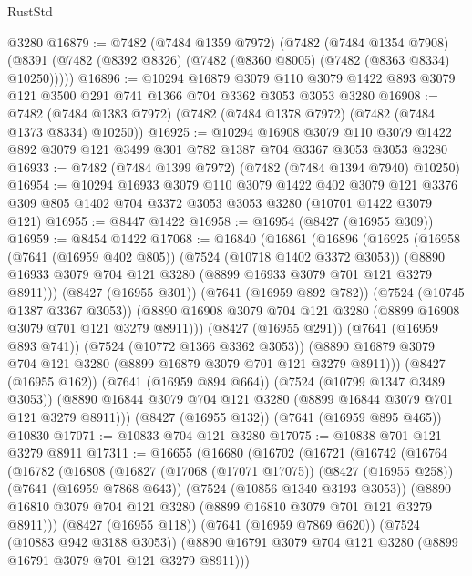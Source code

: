 \begin{lexlean}{RustStd}
\begin{coremodule}
{\begin{coremodule}
{{{{{{{{{{{{{{{{{{{{{{{{{{{{{{{{    @3280
@16879 := @7482
    (@7484 @1359 @7972)
    (@7482
      (@7484 @1354 @7908)
      (@8391 (@7482 (@8392 @8326) (@7482 (@8360 @8005) (@7482 (@8363 @8334) @10250)))))
@16896 := @10294
    @16879
    @3079
    @110
    @3079
    @1422
    @893
    @3079
    @121
    @3500
    @291
    @741
    @1366
    @704
    @3362
    @3053
    @3053
    @3280
@16908 := @7482 (@7484 @1383 @7972) (@7482 (@7484 @1378 @7972) (@7482 (@7484 @1373 @8334) @10250))
@16925 := @10294
    @16908
    @3079
    @110
    @3079
    @1422
    @892
    @3079
    @121
    @3499
    @301
    @782
    @1387
    @704
    @3367
    @3053
    @3053
    @3280
@16933 := @7482 (@7484 @1399 @7972) (@7482 (@7484 @1394 @7940) @10250)
@16954 := @10294
    @16933
    @3079
    @110
    @3079
    @1422
    @402
    @3079
    @121
    @3376
    @309
    @805
    @1402
    @704
    @3372
    @3053
    @3053
    @3280
    (@10701 @1422 @3079 @121)
@16955 := @8447 @1422
@16958 := @16954 (@8427 (@16955 @309))
@16959 := @8454 @1422
@17068 := @16840
    (@16861
      (@16896
        (@16925
          (@16958
            (@7641 (@16959 @402 @805))
            (@7524 (@10718 @1402 @3372 @3053))
            (@8890 @16933 @3079 @704 @121 @3280 (@8899 @16933 @3079 @701 @121 @3279 @8911)))
          (@8427 (@16955 @301))
          (@7641 (@16959 @892 @782))
          (@7524 (@10745 @1387 @3367 @3053))
          (@8890 @16908 @3079 @704 @121 @3280 (@8899 @16908 @3079 @701 @121 @3279 @8911)))
        (@8427 (@16955 @291))
        (@7641 (@16959 @893 @741))
        (@7524 (@10772 @1366 @3362 @3053))
        (@8890 @16879 @3079 @704 @121 @3280 (@8899 @16879 @3079 @701 @121 @3279 @8911)))
      (@8427 (@16955 @162))
      (@7641 (@16959 @894 @664))
      (@7524 (@10799 @1347 @3489 @3053))
      (@8890 @16844 @3079 @704 @121 @3280 (@8899 @16844 @3079 @701 @121 @3279 @8911)))
    (@8427 (@16955 @132))
    (@7641 (@16959 @895 @465))
    @10830
@17071 := @10833 @704 @121 @3280
@17075 := @10838 @701 @121 @3279 @8911
@17311 := @16655
    (@16680
      (@16702
        (@16721
          (@16742
            (@16764
              (@16782
                (@16808
                  (@16827
                    (@17068 (@17071 @17075))
                    (@8427 (@16955 @258))
                    (@7641 (@16959 @7868 @643))
                    (@7524 (@10856 @1340 @3193 @3053))
                    (@8890 @16810 @3079 @704 @121 @3280 (@8899 @16810 @3079 @701 @121 @3279 @8911)))
                  (@8427 (@16955 @118))
                  (@7641 (@16959 @7869 @620))
                  (@7524 (@10883 @942 @3188 @3053))
                  (@8890 @16791 @3079 @704 @121 @3280 (@8899 @16791 @3079 @701 @121 @3279 @8911)))
}}}}}}}}}}}}}}}}}}}}}}}}}}}}}}}}
\end{coremodule}}
\end{coremodule}
\end{lexlean}
